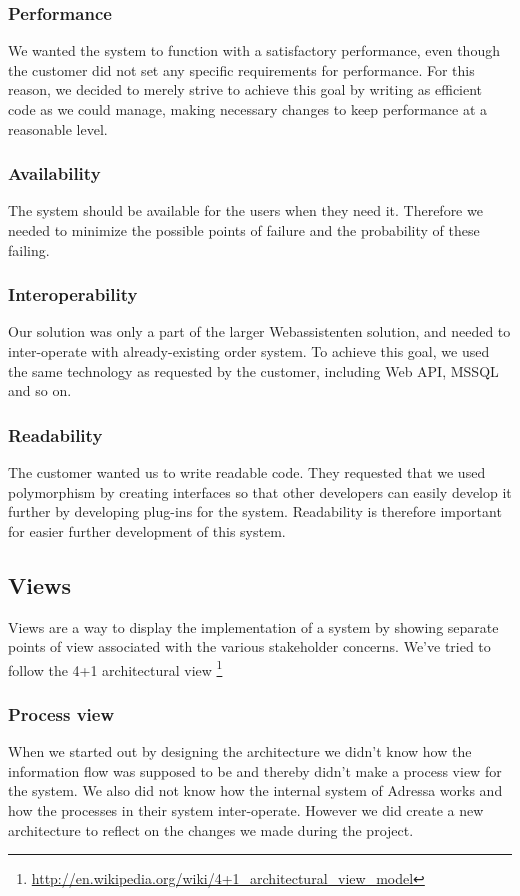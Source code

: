 \subsubsection{Performance}
We wanted the system to function with a satisfactory performance, even though the customer did not set any specific requirements for performance. For this reason, we decided to merely strive to achieve this goal by writing as efficient code as we could manage, making necessary changes to keep performance at a reasonable level. %

\subsubsection{Availability}
The system should be available for the users when they need it. Therefore we needed to minimize the possible points of failure and the probability of these failing. %

\subsubsection{Interoperability}
Our solution was only a part of the larger Webassistenten solution, and needed to inter-operate with already-existing order system. To achieve this goal, we used the same technology as requested by the customer, including Web API, MSSQL and so on.

\subsubsection{Readability}
The customer wanted us to write readable code. They requested that we used polymorphism by creating interfaces so that other developers can easily develop it further by developing plug-ins for the system. Readability is therefore important for easier further development of this system.


\subsection{Views}
Views are a way to display the implementation of a system by showing separate points of view associated with the various stakeholder concerns. We've tried to follow the 4+1 architectural view \footnote{\href{http://en.wikipedia.org/wiki/4+1_Architectural_View_Model}{http://en.wikipedia.org/wiki/4+1\_architectural\_view\_model}}
\subsubsection{Process view}
When we started out by designing the architecture we didn't know how the information flow was supposed to be and thereby didn't make a process view for the system. We also did not know how the internal system of Adressa works and how the processes in their system inter-operate. However we did create a new architecture to reflect on the changes we made during the project. 

